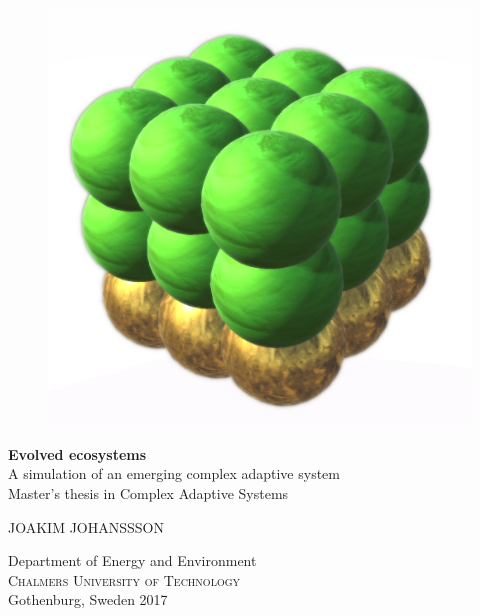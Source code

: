 

\newcommand{\reportTitle}{Evolved ecosystems}
\newcommand{\reportSubTitle}{A simulation of an emerging complex adaptive system}

\begin{titlepage}
			
\addtolength{\voffset}{2cm}

\begin{figure}[H]
\centering
\vspace{2cm}	%
\includegraphics[width=0.7\linewidth]{figure/initorg.png}
\end{figure}

\mbox{}
\vfill
\renewcommand{\familydefault}{\sfdefault} \normalfont %
\textbf{{\Huge \reportTitle{}}}\\[0.5cm]
{\Large \reportSubTitle{}}\\[0.5cm]
Master's thesis in Complex Adaptive Systems \setlength{\parskip}{1cm}

{\Large JOAKIM JOHANSSSON} \setlength{\parskip}{2.9cm}

Department of Energy and Environment \\
\textsc{Chalmers University of Technology} \\
Gothenburg, Sweden 2017

\renewcommand{\familydefault}{\rmdefault} \normalfont %
\end{titlepage}


